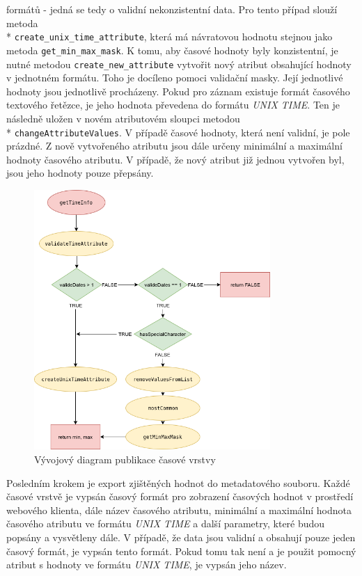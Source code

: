\begin{enumerate}
{formátů} - jedná se tedy o validní nekonzistentní data. Pro tento
případ slouží metoda \\* \verb|create_unix_time_attribute|, která
má návratovou hodnotu stejnou jako metoda \verb|get_min_max_mask|. K
tomu, aby časové hodnoty byly konzistentní, je nutné metodou
\verb|create_new_attribute| vytvořit nový atribut obsahující
hodnoty v jednotném formátu. Toho je docíleno pomoci validační
masky. Její jednotlivé hodnoty jsou jednotlivě procházeny. Pokud
pro záznam existuje formát časového textového řetězce,
je jeho hodnota převedena do formátu \textit{UNIX TIME}. Ten
je následně uložen v novém atributovém sloupci metodou \\*
\verb|changeAttributeValues|. V případě časové hodnoty, která
není validní, je pole prázdné. Z nově vytvořeného atributu
jsou dále určeny minimální a maximální hodnoty časového
atributu. V případě, že nový atribut již jednou vytvořen byl,
jsou jeho hodnoty pouze přepsány.
\end{enumerate}

\begin{figure}[h!]
\centering
\includegraphics[width=0.8\textwidth]{./img/getTimeInfo.png}
\caption{Vývojový diagram publikace časové vrstvy \cite{flow-chart}}
\label{fig:plugin-chart}
\end{figure}

Posledním krokem je export zjištěných hodnot do metadatového
souboru. Každé časové vrstvě je vypsán časový formát pro zobrazení
časových hodnot v prostředí webového klienta, dále název časového atributu,
minimální a maximální hodnota časového atributu ve formátu \textit{UNIX
TIME} a další parametry, které budou popsány a vysvětleny dále. V
případě, že data jsou validní a obsahují pouze jeden časový formát,
je vypsán tento formát. Pokud tomu tak není a je použit pomocný atribut
s hodnoty ve formátu \textit{UNIX TIME}, je vypsán jeho název.

